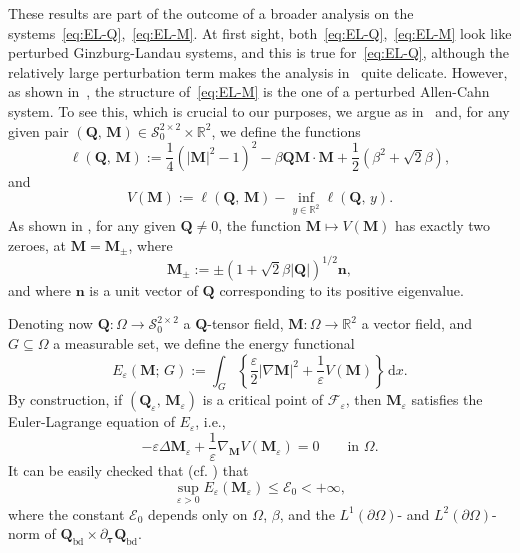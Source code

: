 \documentclass[a4paper, 11pt, twoside, leqno]{article}
\theoremstyle{definition}              %
\theoremstyle{remark}                  %
\newcommand{\abs}[1]{\left| #1 \right|}                             %
\renewcommand{\d}{\mathrm{d}}
\newcommand{\R}{\mathbb{R}}
\newcommand{\Q}{\mathbf{Q}}
\newcommand{\M}{\mathbf{M}}
\newcommand{\n}{\mathbf{n}}
\newcommand{\F}{\mathscr{F}}
\newcommand{\eps}{\varepsilon}
\newcommand{\ttau}{{\boldsymbol{\tau}}}
\newcommand{\Sz}{\mathscr{S}_0^{2\times 2}}
\newcommand{\Qb}{\Q_{\mathrm{bd}}}
\begin{document}
These results are part of the outcome of a broader analysis on 
the systems~\eqref{eq:EL-Q},~\eqref{eq:EL-M}. 
At first sight, both~\eqref{eq:EL-Q},~\eqref{eq:EL-M} look like perturbed 
Ginzburg-Landau systems, and this is true for~\eqref{eq:EL-Q}, although 
the relatively large perturbation term makes the analysis in~\cite{CDS1} quite 
delicate. However, as shown in~\cite{CDS2}, the structure of~\eqref{eq:EL-M} is 
the one of a perturbed Allen-Cahn system.  
%
%
To see this, which is crucial to our purposes, we argue as in~\cite{CDS2} and, for any given pair $(\Q,\,\M) \in \Sz \times \R^2$, 
we define the functions
\begin{equation}\label{eq:ell}
	\ell(\Q,\,\M) := \frac{1}{4}\left( \abs{\M}^2 - 1 \right)^2 
	- \beta \Q\M\cdot\M + \frac{1}{2}\left(\beta^2 
	+ \sqrt{2}\beta\right),
\end{equation}
and
\begin{equation}\label{eq:V}
	V(\M) := \ell(\Q,\,\M) - \inf_{y \in \R^2} \ell(\Q, \, y).
\end{equation}
As shown in \cite[Lemma~1.2]{CDS1}, for any given $\Q \neq 0$, 
the function $\M \mapsto V(\M)$ has exactly two zeroes, at $\M = \M_\pm$, where 
\[
	\M_\pm := \pm \left( 1 + \sqrt{2}\beta \abs{\Q} \right)^{1/2} \n,
\]
and where $\n$ is a unit vector of $\Q$ corresponding to its positive eigenvalue.

Denoting now $\Q : \Omega \to \Sz$ a $\Q$-tensor field, 
$\M : \Omega \to \R^2$ a vector field, and $G \subseteq \Omega$ 
a measurable set, we define the energy functional 
\begin{equation}\label{eq:Eeps}
	E_\eps(\M;\,G) := \int_G\left\{ \frac{\eps}{2} \abs{\nabla \M}^2 + \frac{1}{\eps} V(\M) \right\}\,{\d}x.
\end{equation}
By construction, if $(\Q_\eps,\,\M_\eps)$ is a critical point of $\F_\eps$, 
then $\M_\eps$ satisfies the Euler-Lagrange equation of $E_\eps$, i.e.,
\begin{equation}\label{eq:EL-Eeps}
	-\eps \Delta \M_\eps + \frac{1}{\eps}\nabla_\M V(\M_\eps) = 0 
	\qquad \mbox{in } \Omega.
\end{equation}
It can be easily checked that (cf. \cite[Proposition~2.3]{CDS2}) that 
\begin{equation}\label{eq:Eeps-bound}
	\sup_{\eps > 0} E_\eps(\M_\eps) \leq \mathcal{E}_0 < +\infty,
\end{equation}
where the constant $\mathcal{E}_0$ depends only on $\Omega$, $\beta$, 
and the $L^1(\partial\Omega)$- and $L^2(\partial\Omega)$-norm of 
$\Qb \times \partial_\ttau \Qb$. 
\end{document}
